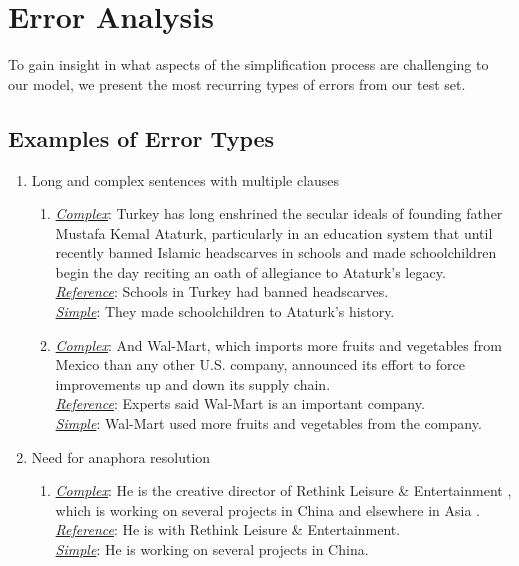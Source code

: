 \documentclass[11pt,a4paper]{article}
\begin{document}
\section{Error Analysis} 
To gain insight in what aspects of the simplification process are challenging to our model, we present the most recurring types of errors from our test set. \\

\subsection{Examples of Error Types}
\begin{enumerate}
\item{Long and complex sentences with multiple clauses}

\begin{enumerate}
\small
\item{\label{longandcomplex1}} \underline{\it Complex}: Turkey has long enshrined the secular ideals of founding father Mustafa Kemal Ataturk, particularly in an education system that until recently banned Islamic headscarves in schools and made schoolchildren begin the day reciting an oath of allegiance to Ataturk's legacy. \\
\underline{\it Reference}: Schools in Turkey had banned headscarves.\\
\underline{\it Simple}: They made schoolchildren to Ataturk's history.

\item{\label{longandcomplex2}} \underline{\it Complex}: And Wal-Mart, which imports more fruits and vegetables from Mexico than any other U.S. company, announced its effort to force improvements up and down its supply chain.\\
\underline{\it Reference}: Experts said Wal-Mart is an important company.\\
\underline{\it Simple}: Wal-Mart used more fruits and vegetables from the company.
\end{enumerate}

\item{Need for anaphora resolution}
\begin{enumerate}
\small
\item {\label{anaphoraresolution1}} \underline{\it Complex}: He is the creative director of Rethink Leisure \& Entertainment , which is working on several projects in China and elsewhere in Asia . \\
\underline{\it Reference}: He is with Rethink Leisure \& Entertainment.\\
\underline{\it Simple}: He is working on several projects in China.


\end{enumerate}
\end{enumerate}
\end{document}
